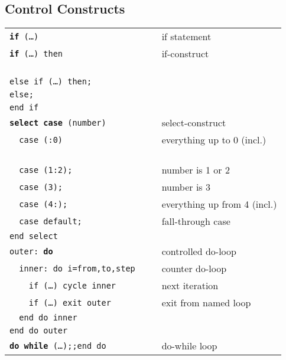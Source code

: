 \documentclass[8pt]{extarticle} %
\begin{document}
\begin{multicols}{3}
  \section{Control Constructs}
  \begin{tabular}{L{0.55\linewidth} L{0.45\linewidth}}
  \tt \textbf{if}~(\dots)~             & if statement                \\
  \tt \textbf{if}~(\dots)~then                     & if-construct                \\
  \tt ~~                                &                             \\
  \tt else~if~(\dots)~then;~            &                             \\
  \tt else;~                            &                             \\
  \tt end~if                                       &                             \\
  \tt \textbf{select case}~(number)                & select-construct            \\
  \tt ~~case~(:0)                                  & everything up to 0 (incl.)  \\
  \tt ~~~~                              &                             \\
  \tt ~~case~(1:2);                     & number is 1 or 2            \\
  \tt ~~case~(3);                       & number is 3                 \\
  \tt ~~case~(4:);                      & everything up from 4 (incl.)\\
  \tt ~~case~default;                   & fall-through case           \\
  \tt end~select                                   &                             \\
  \tt outer:~\textbf{do}                           & controlled do-loop          \\
  \tt ~~inner:~do~i=from,to,step                   & counter do-loop             \\
  \tt ~~~~if~(\dots)~cycle inner                   & next iteration              \\
  \tt ~~~~if~(\dots)~exit outer                    & exit from named loop        \\
  \tt ~~end~do~inner                               &                             \\
  \tt end~do~outer                                 &                             \\
  \tt \textbf{do while}~(\dots);;end do     & do-while loop           \\
  \end{tabular}


\end{multicols}
\end{document}

